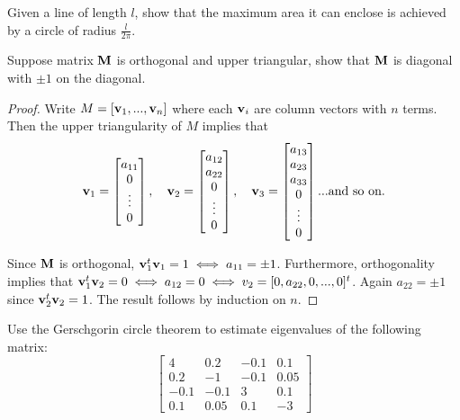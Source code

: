 \begin{problembox}{}{}
Given a line of length $l$, show that the maximum area it can enclose is achieved by a circle of radius $\frac{l}{2\pi}.$
\end{problembox}


\begin{problembox}{}{}
Suppose matrix $\mathbf{M}$ is orthogonal and upper triangular, show that $\mathbf{M}$ is diagonal with $\pm1$ on the diagonal.
\end{problembox}

\begin{proof}
Write $M = [\mathbf{v}_1, ..., \mathbf{v}_n]$ where each $\mathbf{v}_i$ are column vectors with $n$ terms. Then the upper triangularity of $M$ implies that 
\begin{align*}
\mathbf{v}_1 = 
\begin{bmatrix}
    a_{11} \\
    0 \\ 
    \vdots \\
	0 \\
\end{bmatrix}
, \quad \mathbf{v}_2 = 
\begin{bmatrix}
    a_{12} \\
    a_{22} \\
    0 \\ 
	\vdots \\
	0 \\
\end{bmatrix}
, \quad \mathbf{v}_3 = 
\begin{bmatrix}
    a_{13} \\
    a_{23} \\
    a_{33} \\ 
    0 \\
	\vdots \\
	0 \\
\end{bmatrix}
... \text{and so on.}
\end{align*}

Since $\mathbf{M}$ is orthogonal, $\mathbf{v}_1^t\mathbf{v}_1 = 1 \iff a_{11} = \pm1$. Furthermore, orthogonality implies that $\mathbf{v}_1^t \mathbf{v}_2 = 0 \iff a_{12} = 0 \iff v_2 = [0, a_{22}, 0, ..., 0]^t$. Again $a_{22} = \pm1$ since $\mathbf{v}_2^t\mathbf{v}_2 = 1$. The result follows by induction on $n$. 
\end{proof}

\begin{problembox}{\hfill {\small \cite[Exercise 8.23]{lange2010numerical}}}{}
Use the Gerschgorin circle theorem to estimate eigenvalues of the following matrix:
\[ 
\begin{bmatrix}
    4 & 0.2 & -0.1 & 0.1\\
    0.2 & -1 & -0.1 & 0.05\\
    -0.1 & -0.1 & 3 & 0.1\\
    0.1 & 0.05 & 0.1 & -3
\end{bmatrix}
\]
\end{problembox}

